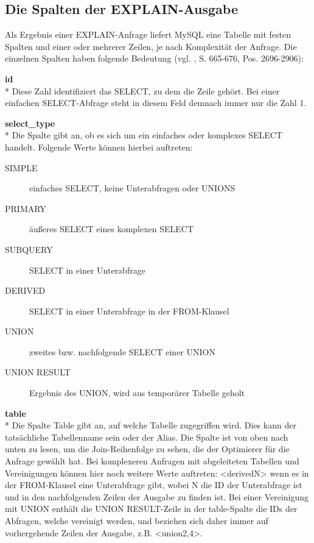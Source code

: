 \subsection{Die Spalten der EXPLAIN-Ausgabe}
Als Ergebnis einer EXPLAIN-Anfrage liefert MySQL eine Tabelle mit festen Spalten und einer oder mehrerer Zeilen, je nach Komplexität der Anfrage. Die einzelnen Spalten haben folgende Bedeutung (vgl. \cite{refman2}, 
\cite{Schwartz2009} S. 665-676, 
\cite{Bradford2011} Pos. 2696-2906):

\textbf{id}\\*
Diese Zahl identifiziert das SELECT, zu dem die Zeile gehört. Bei einer einfachen SELECT-Abfrage steht in diesem Feld demnach immer nur die Zahl 1.

\textbf{select\_type}\\*
Die Spalte gibt an, ob es sich um ein einfaches oder komplexes SELECT handelt. Folgende Werte können hierbei auftreten:
\begin{description}
	\item[SIMPLE] einfaches SELECT, keine Unterabfragen oder UNIONS
	\item[PRIMARY] äußeres SELECT eines komplexen SELECT
	\item[SUBQUERY] SELECT in einer Unterabfrage
	\item[DERIVED] SELECT in einer Unterabfrage in der FROM-Klausel
	\item[UNION] zweites bzw. nachfolgende SELECT einer UNION
	\item[UNION RESULT] Ergebnis des UNION, wird aus temporärer Tabelle geholt
\end{description}

\textbf{table}\\*
Die Spalte Table gibt an, auf welche Tabelle zugegriffen wird. Dies kann der tatsächliche Tabellenname sein oder der Alias. Die Spalte ist von oben nach unten zu lesen, um die Join-Reihenfolge zu sehen, die der Optimierer für die Anfrage gewählt hat.
Bei komplexeren Anfragen mit abgeleiteten Tabellen und Vereinigungen können hier noch weitere Werte auftreten: <derivedN> wenn es in der FROM-Klausel eine Unterabfrage gibt, wobei N die ID der Unterabfrage ist und in den nachfolgenden Zeilen der Ausgabe zu finden ist. Bei einer Vereinigung mit UNION enthält die UNION RESULT-Zeile in der table-Spalte die IDs der Abfragen, welche vereinigt werden, und beziehen sich daher immer auf vorhergehende Zeilen der Ausgabe, z.B. <union2,4>.

